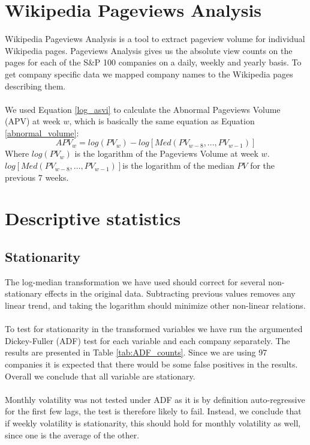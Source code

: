 \section{Wikipedia Pageviews Analysis}

Wikipedia Pageviews Analysis is a tool to extract pageview volume for individual Wikipedia pages. Pageviews Analysis gives us the absolute view counts on the pages for each of the S\&P 100 companies on a daily, weekly and yearly basis. To get company specific data we mapped company names to the Wikipedia pages describing them.
\\\\
We used Equation \eqref{log_asvi} to calculate the Abnormal Pageviews Volume (APV) at week $w$, which is basically the same equation as Equation \eqref{abnormal_volume}:
\begin{equation}
   \label{abnormal_pageviews_volume} 
   APV_{w} = log(PV_{w}) - log[Med(PV_{w-8},...,PV_{w-1})] 
\end{equation}
   Where $log(PV_{w})$ is the logarithm of the Pageviews Volume at week $w$. $log[Med(PV_{w-8},...,PV_{w-1})]$is the logarithm of the median $PV$ for the previous 7 weeks.


\section{Descriptive statistics}

\subsection{Stationarity}
The log-median transformation we have used should correct for several non-stationary effects in the original data. 
Subtracting previous values removes any linear trend, and taking the logarithm should minimize other non-linear relations. 
\\\\
To test for stationarity in the transformed variables we have run the argumented Dickey-Fuller (ADF) test for each variable and each company separately. The results are presented in Table \ref{tab:ADF_counts}. Since we are using 97 companies it is expected that there would be some false positives in the results. Overall we conclude that all variable are stationary. 
\\\\
Monthly volatility was not tested under ADF as it is by definition auto-regressive for the first few lags, the test is therefore likely to fail. Instead, we conclude that if weekly volatility is stationarity, this should hold for monthly volatility as well, since one is the average of the other.

